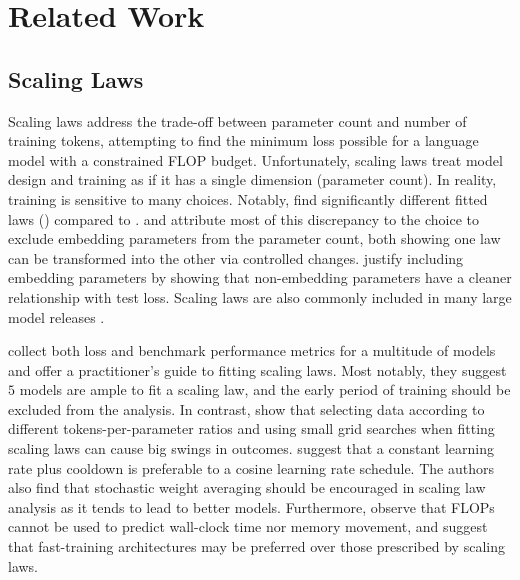 \section{Related Work}
\label{sec:related_work}
\subsection{Scaling Laws}
Scaling laws address the trade-off between parameter count and number of training tokens, attempting to find the minimum loss possible for a language model with a constrained FLOP budget.
Unfortunately, scaling laws treat model design and training as if it has a single dimension (parameter count).  In reality, training is sensitive to many choices. 
Notably, \citet{hoffmann2022empirical} find significantly different 
fitted laws () compared to \citet{kaplan2020scaling}.
\citet{pearce2024reconciling} and \citet{porian2024resolving} attribute most of this discrepancy to the choice to exclude embedding parameters from the parameter count, both showing one law can be transformed into the other via controlled changes.
\citet{kaplan2020scaling} justify including embedding parameters by showing that non-embedding parameters have a cleaner relationship with test loss. %
Scaling laws are also commonly included in many large model releases \citep{hu2024minicpm, bi2024deepseek, dubey2024llama}.

\citet{choshen2024hitchhiker} collect both loss and benchmark performance metrics for a multitude of models and offer a practitioner's guide to fitting scaling laws.
Most notably, they suggest \(5\) models are ample to fit a scaling law, and the early period of training should be excluded from the analysis.
In contrast, \citet{misfitting} show that selecting data according to different tokens-per-parameter ratios and using small grid searches when fitting scaling laws can cause big swings in outcomes.
\citet{hagele2024scaling} suggest that a constant learning rate plus cooldown is preferable to a cosine learning rate schedule.
The authors also find that stochastic weight averaging should be encouraged in scaling law analysis as it tends to lead to better models.
Furthermore, \citet{memmoves} observe that FLOPs cannot be used to predict wall-clock time nor memory movement, and suggest that fast-training architectures may be preferred over those prescribed by scaling laws.

